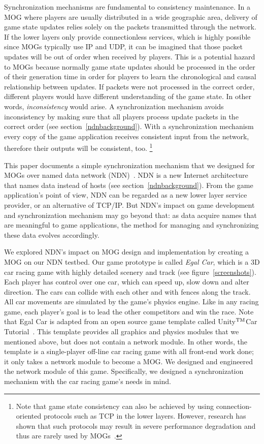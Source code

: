 \documentclass{article}
\def\tm{\leavevmode\hbox{$\rm {}^{TM}$}} %
\begin{document}
Synchronization mechanisms are fundamental to consistency maintenance. In a MOG where players are usually distributed in a wide geographic area, delivery of game state updates relies solely on the packets transmitted through the network. If the lower layers only provide connectionless services, which is highly possible since MOGs typically use IP and UDP, it can be imagined that those packet updates will be out of order when received by players. This is a potential hazard to MOGs because normally game state updates should be processed in the order of their generation time in order for players to learn the chronological and causal relationship between updates. If packets were not processed in the correct order, different players would have different understanding of the game state. In other words, \emph{inconsistency} would arise. A synchronization mechanism avoids inconsistency by making sure that all players process update packets in the correct order (see section~\ref{ndnbackground}). With a synchronization mechanism every copy of the game application receives consistent input from the network, therefore their outputs will be consistent, too.
\footnote{Note that game state consistency can also be achieved by using connection-oriented protocols such as TCP in the lower layers. However, research has shown that such protocols may result in severe performance degradation and thus are rarely used by MOGs~\cite{Fgame}.}

This paper documents a simple synchronization mechanism that we designed for MOGs over named data network (NDN)~\cite{Jndn}. NDN is a new Internet architecture that names data instead of hosts (see section~\ref{ndnbackground}). From the game application's point of view, NDN can be regarded as a new lower layer service provider, or an alternative of TCP\slash IP. But NDN's impact on game development and synchronization mechanism may go beyond that: as data acquire names that are meaningful to game applications, the method for managing and synchronizing these data evolves accordingly. %

We explored NDN's impact on MOG design and implementation by creating a MOG on our NDN testbed. Our game prototype is called \emph{Egal Car}, which is a 3D car racing game with highly detailed scenery and track (see figure~\ref{screenshots}). Each player has control over one car, which can speed up, slow down and alter direction. The cars can collide with each other and with fences along the track. All car movements are simulated by the game's physics engine. Like in any racing game, each player's goal is to lead the other competitors and win the race. Note that Egal Car is adapted from an open source game template called Unity\tm  Car Tutorial~\cite{UnityCar}. This template provides all graphics and physics modules that we mentioned above, but does not contain a network module. In other words, the template is a single-player off-line car racing game with all front-end work done; it only takes a network module to become a MOG. We designed and engineered the network module of this game. Specifically, we designed a synchronization mechanism with the car racing game's needs in mind. 
\end{document}
